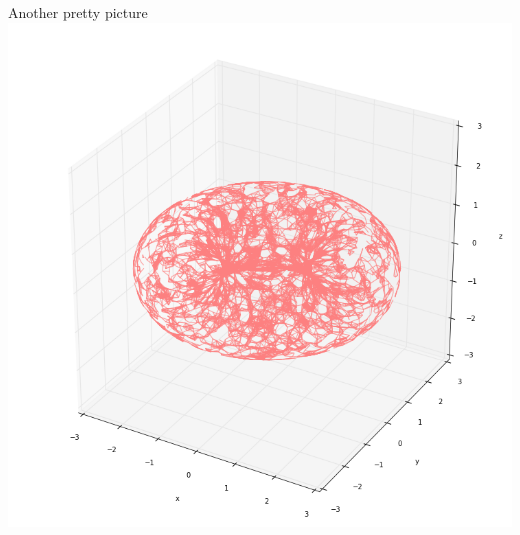 \documentclass{beamer}
\begin{document}
\begin{frame}{}
\begin{columns}[t]
\begin{column}{0.32\linewidth}
\begin{block}{Another pretty picture}
\includegraphics[width=1\columnwidth]{torus.png}

\end{block}

\end{column}%

\end{columns}
\end{frame}
\end{document}
